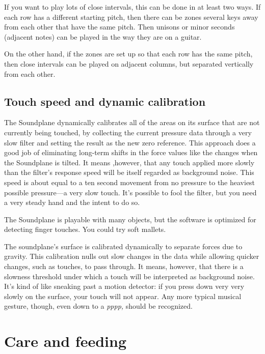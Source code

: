If you want to play lots of close intervals, this can be done in at least two ways.  If each row has a different starting pitch, then there can be zones several keys away from each other that have the same pitch.  Then unisons or minor seconds (adjacent notes) can be played in the way they are on a guitar. 

On the other hand, if the zones are set up so that each row has the same pitch, then close intervals can be played on adjacent columns, but separated vertically from each other.  

 

\section{Touch speed and dynamic calibration}


The Soundplane dynamically calibrates all of the areas on its surface that are not currently being touched, by collecting the current pressure data through a very slow filter and setting the result as the new zero reference.   This approach does a good job of eliminating long-term shifts in the force values like the changes when the Soundplane is tilted.  It means ,however, that any touch applied more slowly than the filter's response speed will be itself regarded as background noise.  This speed is about equal to a ten second movement from no pressure to the heaviest possible pressure—a very slow touch.  It's possible to fool the filter, but you need a very steady hand and the intent to do so.  

The Soundplane is playable with many objects, but the software is optimized for detecting finger touches.  You could try soft mallets. 
 

The soundplane's surface is calibrated dynamically to separate forces due to gravity.  This calibration nulls out slow changes in the data while allowing quicker changes, such as touches, to pass through.  It means, however, that there is a slowness threshold under which a touch will be interpreted as background noise.  It's kind of like sneaking past a motion detector: if you press down very very slowly on the surface, your touch will not appear.  Any more typical musical gesture, though, even down to a \emph{pppp,} should be recognized.


\chapter{Care and feeding}

